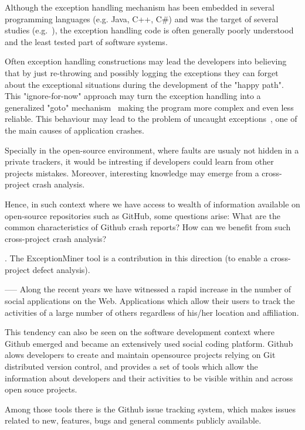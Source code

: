\documentclass[conference]{IEEEtran}
\begin{document}
Although the exception handling mechanism has been embedded in several 
programming languages (e.g. Java, C++, C\#) and was the target of several studies
(e.g.~\cite{miller1997issues,Robil00,shah2010understanding, garcia2007extracting, garcia2001comparative,cabral2007exception,coelho2011unveiling}),
the exception handling code is often generally poorly understood and the least
tested part of software systems.

Often exception handling constructions may lead the developers into believing that
by just re-throwing and possibly logging the exceptions they can forget about the exceptional
situations during the development of the "happy path". This "ignore-for-now"
approach may turn the exception handling into a generalized "goto"
mechanism~\cite{mandrioli1992advances} making the program more complex and even
less reliable. This behaviour may lead to the problem of uncaught exceptions~\cite{jo2004uncaught}, one of the main causes of application crashes.

Specially in the open-source environment, where faults are usualy not hidden in a private trackers,  it would be intresting if developers could learn from other projects mistakes. Moreover, interesting knowledge may emerge from a cross-project crash analysis.
 
Hence, in such context where we have access to wealth of information available
on open-source repositories such as GitHub, some questions arise: What are the common
characteristics of Github crash reports? How can we benefit from such cross-project crash analysis?



. The ExceptionMiner tool is a contribution in this direction (to enable a cross-project defect analysis). 

-----
Along the recent years we have witnessed a rapid increase in 
the number of social applications on the Web. Applications which 
allow their users to track the activities of a large number 
of others regardless of his/her location and affiliation. 

This tendency can also be seen on the software development context 
where Github emerged and became an extensively used social coding 
platform. Github alows developers to create and maintain opensource 
projects relying  on Git distributed version control, and provides a set 
of tools which allow the information about developers and their activities
 to be visible within and across open souce projects.

Among those tools there is the Github issue tracking system, which makes
issues related to new, features, bugs and general comments publicly available.
\end{document}
